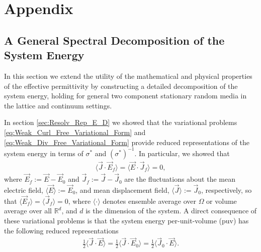 \documentclass[english,12pt,jmp,graphicx]{revtex4-1}
\begin{document}
\section{Appendix}
\subsection{A General Spectral Decomposition of the System Energy}
\label{subsec:Spec_Decomp_Energy}
%
In this section we extend the utility of the mathematical and physical
properties of the effective permittivity by constructing a detailed
decomposition of the system energy, holding for general two component
stationary random media in the lattice and continuum settings.

In
section \ref{sec:Resolv_Rep_E_D} we showed that the variational 
problems \eqref{eq:Weak_Curl_Free_Variational_Form} and
\eqref{eq:Weak_Div_Free_Variational_Form} provide reduced
representations of the system energy in terms of $\sigma^*$ and
$(\sigma^*)^{-1}$. In particular, we showed that
%
\begin{align}\label{eq:Energy_Constraint_E_D}
  \langle\vec{J}\cdot\vec{E}_f\rangle=\langle\vec{E}\cdot\vec{J}_f\rangle=0,
\end{align}
%
where $\vec{E}_f:=\vec{E}-\vec{E}_0$ and
$\vec{J}_f:=\vec{J}-\vec{J}_0$ are the fluctuations about the mean
electric field, $\langle\vec{E}\rangle:=\vec{E}_0$, and mean displacement field, 
$\langle\vec{J}\rangle:=\vec{J}_0$, respectively, so that $\langle\vec{E}_f\rangle=\langle\vec{J}_f\rangle=0$, where
$\langle\cdot\rangle$ denotes ensemble average over $\Omega$ or volume average over all
$\mathbb{R}^d$, and $d$ is the dimension of the system. A direct
consequence of these variational problems is that the system energy
per-unit-volume (puv) has the following reduced representations
\cite{Jackson-1999}  
%
\begin{align}\label{eq:Reduced_Energy_E_D}
  \frac{1}{2}\langle\vec{J}\cdot\vec{E}\rangle=\frac{1}{2}\langle\vec{J}\cdot\vec{E}_0\rangle
  =\frac{1}{2}\langle\vec{J}_0\cdot\vec{E}\rangle.
\end{align}
%
\end{document}
